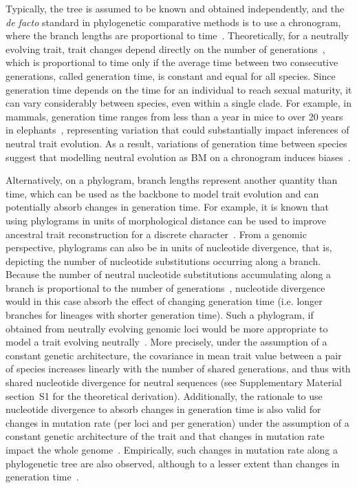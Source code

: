 \documentclass{article}
\begin{document}
Typically, the tree is assumed to be known and obtained independently, and the \textit{de facto} standard in phylogenetic comparative methods is to use a chronogram, where the branch lengths are proportional to time~\citep{felsenstein_phylogenies_1985, harmon_phylogenetic_2018}.
Theoretically, for a neutrally evolving trait, trait changes depend directly on the number of generations~\citep{hansen_translating_1996}, which is proportional to time only if the average time between two consecutive generations, called generation time, is constant and equal for all species.
Since generation time depends on the time for an individual to reach sexual maturity, it can vary considerably between species, even within a single clade.
For example, in mammals, generation time ranges from less than a year in mice to over 20 years in elephants~\citep{demagalhaes_database_2009}, representing variation that could substantially impact inferences of neutral trait evolution.
As a result, variations of generation time between species suggest that modelling neutral evolution as BM on a chronogram induces biases~\citep{litsios_effects_2012}.

Alternatively, on a phylogram, branch lengths represent another quantity than time, which can be used as the backbone to model trait evolution and can potentially absorb changes in generation time.
For example, it is known that using phylograms in units of morphological distance can be used to improve ancestral trait reconstruction for a discrete character~\citep{wilson_chronogram_2022}.
From a genomic perspective, phylograms can also be in units of nucleotide divergence, that is, depicting the number of nucleotide substitutions occurring along a branch.
Because the number of neutral nucleotide substitutions accumulating along a branch is proportional to the number of generations~\citep{kimura_evolutionary_1968, kimura_neutral_1983}, nucleotide divergence would in this case absorb the effect of changing generation time (i.e. longer branches for lineages with shorter generation time).
Such a phylogram, if obtained from neutrally evolving genomic loci would be more appropriate to model a trait evolving neutrally~\citep{latrille_detecting_2024}.
More precisely, under the assumption of a constant genetic architecture, the covariance in mean trait value between a pair of species increases linearly with the number of shared generations, and thus with shared nucleotide divergence for neutral sequences (see Supplementary Material section~S1 for the theoretical derivation).
Additionally, the rationale to use nucleotide divergence to absorb changes in generation time is also valid for changes in mutation rate (per loci and per generation) under the assumption of a constant genetic architecture of the trait and that changes in mutation rate impact the whole genome~\citep{latrille_detecting_2024}.
Empirically, such changes in mutation rate along a phylogenetic tree are also observed, although to a lesser extent than changes in generation time~\citep{bergeron_evolution_2023}.
\end{document}
